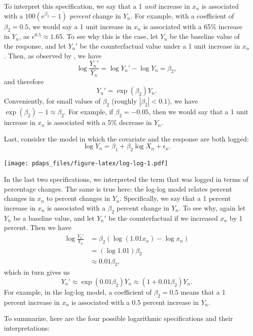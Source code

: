 \documentclass[12pt,oneside,openany]{book}
\begin{document}
To interpret this specification, we say that a 1 \emph{unit} increase in
\(x_n\) is associated with a \(100(e^{\beta_2} - 1)\) \emph{percent}
change in \(Y_n\). For example, with a coefficient of \(\beta_2 = 0.5\),
we would say a 1 unit increase in \(x_n\) is associated with a 65\%
increase in \(Y_n\), as \(e^{0.5} \approx 1.65\). To see why this is the
case, let \(Y_n\) be the baseline value of the response, and let
\(Y_n'\) be the counterfactual value under a 1 unit increase in \(x_n\).
Then, as observed by \citet[93--94]{angrist2015mastering}, we have \[
\log \frac{Y_n'}{Y_n} = \log Y_n' - \log Y_n = \beta_2,
\] and therefore \[
Y_n' = \exp(\beta_2) Y_n.
\] Conveniently, for small values of \(\beta_2\) (roughly
\(|\beta_2| < 0.1\)), we have \(\exp(\beta_2) - 1 \approx \beta_2\). For
example, if \(\beta_2 = -0.05\), then we would say that a 1 unit
increase in \(x_n\) is associated with a 5\% decrease in \(Y_n\).

Last, consider the model in which the covariate and the response are
both logged: \[
\log Y_n = \beta_1 + \beta_2 \log X_n + \epsilon_n.
\]

\texttt{[image: pdaps\_files/figure-latex/log-log-1.pdf]}

In the last two specifications, we interpreted the term that was logged
in terms of percentage changes. The same is true here: the log-log model
relates percent changes in \(x_n\) to percent changes in \(Y_n\).
Specifically, we say that a 1 percent increase in \(x_n\) is associated
with a \(\beta_2\) percent change in \(Y_n\). To see why, again let
\(Y_n\) be a baseline value, and let \(Y_n'\) be the counterfactual if
we increased \(x_n\) by 1 percent. Then we have \[
\begin{aligned}
\log \frac{Y_n'}{Y_n}
&= \beta_2 (\log(1.01 x_n) - \log x_n) \\
&= (\log 1.01) \beta_2 \\
&\approx 0.01 \beta_2,
\end{aligned}
\] which in turn gives us \[
Y_n' \approx \exp(0.01 \beta_2) Y_n \approx (1 + 0.01 \beta_2) Y_n.
\] For example, in the log-log model, a coefficient of \(\beta_2 = 0.5\)
means that a 1 percent increase in \(x_n\) is associated with a 0.5
percent increase in \(Y_n\).

To summarize, here are the four possible logarithmic specifications and
their interpretations:
\end{document}
